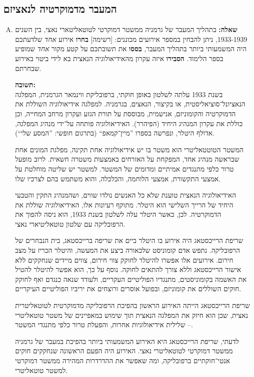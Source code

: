 \documentclass[a4paper]{article}
\begin{document}
	\subsection{המעבר מדמוקרטיה לנאציזם}
		\begin{enumerate}[A.]
			\item \textbf{שאלה: }
			בתהליך המעבר של גרמניה ממשטר דמוקרטי לטוטאליטארי נאצי, בין השנים 1933-1939, ניתן להבחין במספר אירועים מכוננים: [רשימה] \textbf{בחרו} אירוע \textit{אחד} שלדעתכם היה המשמעותי ביותר בתהליך המעבר, \textbf{בססו} את תשובתכם על קטע מקור \textit{אחד} שמופיע בספר הלימוד. \textbf{הסבירו} איזה עקרון מהאידיאולוגיה הנאצית בא לידי ביטוי באירוע שבחרתם. 
			
			\textbf{תשובה: }\\
			בשנת 1933 עלתה לשלטון באופן חוקתי, ברפובליקת ווינמאר הגרמנית, המפלגה הנאציונל־סוציאליסטית, או בקיצור, הנאצים, בגרמניה. למפלגה אידיאולוגיה השוללת את הדמוקרטיה והקומוניזם, אנישמית, מבוססת על תורת הגזע ועקרון מרחב המחייה, וכן כוללת את עקרון המנהיג היחיד (הפיהרר). האידיאולוגיה פותחה על־ידי מנהיג המפלגה, אדולף היטלר, ונפרשה בספרו ''מיין־קמאפ`` (בתרגום חופשי: ''המסע שלי``). 
			
			המשטר הטוטטאליטרי הוא משטר בו יש אידיאולוגיה אחת תקינה, מפלגת המונים אחת שבראשה מנהיג אחד, המפקחת על האזרחים באמצעות משטרה חשאית. לרוב מופעל טרור כלפי מתנגדים אמיתיים ומדומים של המשטר. למשטר יש שליטה מוחלטת על אמצעי התקשורת, אמצעי הלוחמה, והכלכלה, והוא משתמש בהם לצרכיו שלו. 
			
			האידיאולוגיה הנאצית טוענת שלא כל האנשים נולדו שווים, ושהמנהיג התקין והטבעי היחיד של הרייך השלישי הוא היטלר. מתוקף רעיונות אלו, האידיאולוגיה שוללת את הדמוקרטיה. לכן, כאשר היטלר עלה לשלטון בשנת 1933, הוא ניסה להפוך את הרפובליקה עם שלטון טוטאליטיארי נאצי. 
			
			שריפת הרייכסטאג היה אירוע בו היטלר ביים את שריפה ברייכסטאג, בית הנבחרים של הרפובליקה. נתפש אדם קומוניסט שלכאורה ביצע את המעשה, והיטלר הכריז על מצב חירום. אירועים אלו אפשרו להיטלר לחוקק צווי חירום, צווים מיידים שנחקקים ללא אישור הרייכסטאג וללא צורך להתאים לחוקה. נוסף על כך, הוא אפשר להיטלר להטיל את האשמה בקומוניסטים, מתנגדיו הפוליטיים העקריים, ולעודד שנאה כנגדם ואף לחוקק חוקים השוללים את קומוניזם, ובפועל אוסרים ורוצחים את יריביו הפוליטיים העיקריים. 
			
			שריפת הרייכסטאג הייתה האירוע הראשון בהפיכת הרפובליקה מדמוקרטית לטוטאליטרית נאצית, שכן הוא חיזק את המפלגה הנאצית תוך שימוש במאפיינים של משטר טוטאליטרי – שלילית אידיאולוגיות אחרות, והפעלת טרור כלפי מתנגדי המשטר. 
			
			לדעתי, שריפת הרייכסטאג היא האירוע המשמעותי ביותר בהפיכת במעבר של גרמניה ממשטר דמוקרטי לטוטאליטרי נאצי. האירוע היה הפעם הראשונה שנחקקים חוקים אנטי־חוקתיים ברפובליקה, ומה שאפשר את ההדרדרות המהירה ממשטר דמוקרטי למשטר טוטאליטרי. 
			

\end{enumerate}
\end{document}
